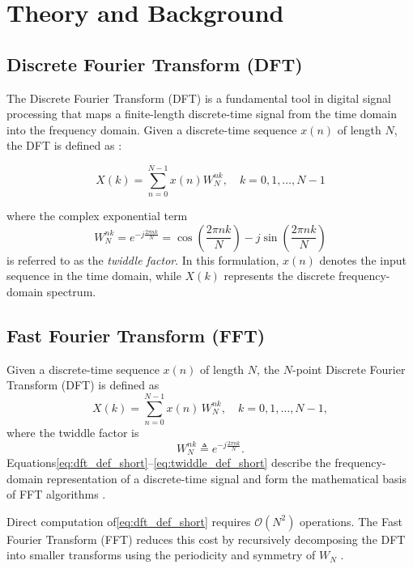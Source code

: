 \section{Theory and Background}

\subsection{Discrete Fourier Transform (DFT)}

The Discrete Fourier Transform (DFT) is a fundamental tool in digital signal processing that maps a finite-length discrete-time signal from the time domain into the frequency domain. Given a discrete-time sequence $x(n)$ of length $N$, the DFT is defined as \cite{proakis_fft}:

\begin{equation}
X(k) = \sum_{n=0}^{N-1} x(n) W_N^{nk}, \quad k = 0,1,\dots,N-1
\end{equation}

where the complex exponential term
\begin{equation}
W_N^{nk} = e^{-j\frac{2\pi nk}{N}} = \cos\left(\frac{2\pi nk}{N}\right) - j\sin\left(\frac{2\pi nk}{N}\right)
\end{equation}
is referred to as the \textit{twiddle factor}. In this formulation, $x(n)$ denotes the input sequence in the time domain, while $X(k)$ represents the discrete frequency-domain spectrum.

\subsection{Fast Fourier Transform (FFT)}

Given a discrete-time sequence $x(n)$ of length $N$, the $N$-point Discrete Fourier Transform (DFT) is defined as
\begin{equation}
X(k) = \sum_{n=0}^{N-1} x(n)\, W_N^{nk}, 
\quad k = 0,1,\dots,N-1,
\label{eq:dft_def_short}
\end{equation}
where the twiddle factor is
\begin{equation}
W_N^{nk} \triangleq e^{-j\frac{2\pi nk}{N}} .
\label{eq:twiddle_def_short}
\end{equation}
Equations\eqref{eq:dft_def_short}--\eqref{eq:twiddle_def_short} describe the frequency-domain representation of a discrete-time signal and form the mathematical basis of FFT algorithms \cite{proakis_fft}.

Direct computation of\eqref{eq:dft_def_short} requires $\mathcal{O}(N^2)$ operations. The Fast Fourier Transform (FFT) reduces this cost by recursively decomposing the DFT into smaller transforms using the periodicity and symmetry of $W_N$ \cite{proakis_fft}.

